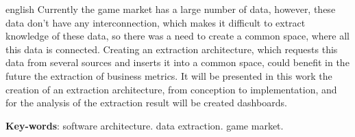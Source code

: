 \begin{resumo}[Abstract]
 \begin{otherlanguage*}{english}
 	Currently the game market has a large number of data, however, these data don't have any interconnection, which makes it difficult to extract knowledge of these data, so there was a need to create a common space, where all this data is connected. Creating an extraction architecture, which requests this data from several sources and inserts it into a common space, could benefit in the future the extraction of business metrics. It will be presented in this work the creation of an extraction architecture, from conception to implementation, and for the analysis of the extraction result will be created dashboards.

   \vspace{\onelineskip}
 
   \noindent 
   \textbf{Key-words}: software architecture. data extraction. game market.
 \end{otherlanguage*}
\end{resumo}
